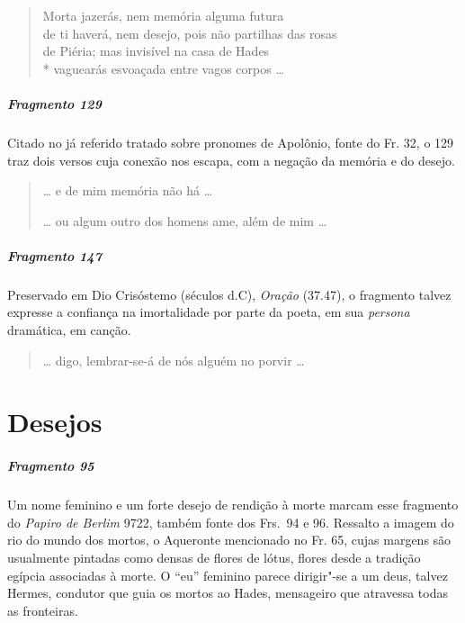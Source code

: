 {\begin{verse}
Morta jazerás, nem memória alguma futura\\
de ti haverá, nem desejo, pois não partilhas das \qb{}rosas\\
de Piéria; mas invisível na casa de Hades\\*
vaguearás esvoaçada entre vagos corpos \ldots{}
\end{verse}


\paragraph{Fragmento 129}

Citado no já referido tratado sobre pronomes de Apolônio, fonte do Fr. 32, o 129 traz dois versos cuja conexão nos escapa, com a negação da memória e do desejo.

\begin{verse}
\ldots{} e de mim memória não há \ldots{}

\ast\quad\ast\quad\ast

\ldots{} ou algum outro dos homens ame, além de mim \ldots{}
\end{verse}

\paragraph{Fragmento 147}

{\small Preservado em Dio Crisóstemo (séculos  d.C), \textit{Oração} (37.47), o fragmento talvez expresse a confiança na imortalidade por parte da poeta, em sua \textit{persona} dramática, em canção.}

\begin{verse}
\ldots{} digo, lembrar-se-á de nós alguém no porvir \ldots{}
\end{verse}

\chapter{Desejos}

\paragraph{Fragmento 95}

{\small Um nome feminino e um forte desejo de rendição à morte marcam esse fragmento do
\textit{Papiro de Berlim }9722, também fonte dos Frs.~94 e 96. Ressalto a imagem do
rio do mundo dos mortos, o Aqueronte mencionado no Fr. 65, cujas margens são usualmente pintadas
como densas de flores de lótus, flores desde a tradição egípcia associadas à morte. O “eu” feminino parece dirigir"-se a um deus,
talvez Hermes, condutor que guia os mortos ao Hades, mensageiro que atravessa todas as fronteiras.}

}
